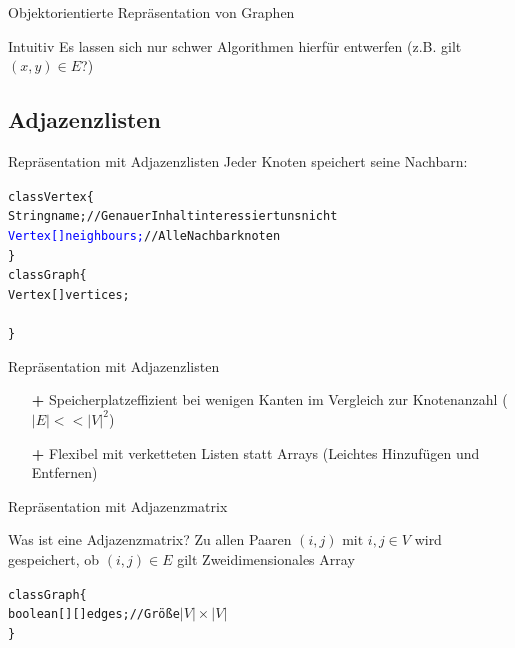\begin{frame}{Objektorientierte Repräsentation von Graphen}
	\begin{itemize}
		\pitem[\textbf{+}] Intuitiv
		\pitem[\textbf{--}] Es lassen sich nur schwer Algorithmen hierfür entwerfen (z.B. gilt $(x,y) \in E$?)
	\end{itemize}
\end{frame}

\subsection{Adjazenzlisten}
\begin{frame}{Repräsentation mit Adjazenzlisten}
	Jeder Knoten speichert seine Nachbarn:
	\begin{alltt}
		class Vertex \{ 					\\                                  
		\hspace{0.4cm} String name; //Genauer Inhalt interessiert uns nicht	\\                               
		\hspace{0.4cm}   \textcolor{blue}{Vertex[] neighbours;} //Alle Nachbarknoten\\
		\}\\
		\vspace{0.3cm}
		class Graph \{					\\
		\hspace{0.4cm}   Vertex[] vertices;\\
		\hspace{0.4cm}  \deleted{Edge[] edges;}	\\
		\}	\\
	\end{alltt}
\end{frame}

\begin{frame}{Repräsentation mit Adjazenzlisten}
	\begin{itemize}
		\item[\textbf{+}] Speicherplatzeffizient bei wenigen Kanten im Vergleich zur Knotenanzahl ($|E| << |V|^2$)
		\item[\textbf{+}] Flexibel mit verketteten Listen statt Arrays (Leichtes Hinzufügen und Entfernen)
	\end{itemize}
\end{frame}



\begin{frame}{Repräsentation mit Adjazenzmatrix}
	\begin{itemize}
		\pitem Was ist eine Adjazenzmatrix?
		\pitem Zu allen Paaren $(i,j) \text{ mit } i, j \in V$ wird gespeichert, ob $(i,j) \in E$ gilt
		\pitem Zweidimensionales Array
	\end{itemize}
	\begin{alltt}
		class Graph \{					\\
		\hspace{0.4cm}   boolean[][] edges; //Größe $|V| \times |V|$\\
		\}	\\
	\end{alltt}
\end{frame}

